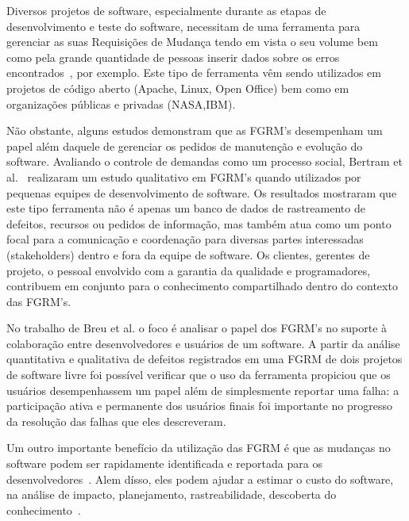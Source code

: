 Diversos projetos de software, especialmente durante as etapas de desenvolvimento e teste do
software, necessitam de uma ferramenta para gerenciar as suas Requisições de Mudança tendo em vista
o seu volume bem como pela grande quantidade de pessoas inserir dados sobre os erros
encontrados~\cite{1407819}, por exemplo. Este tipo de ferramenta vêm sendo utilizados em projetos de
código aberto (Apache, Linux, Open Office) bem como em organizações públicas e privadas
(NASA,IBM).

Não obstante, alguns estudos demonstram que as FGRM's desempenham um papel além daquele de gerenciar
os pedidos de manutenção e evolução do software. Avaliando o controle de demandas como um processo
social, Bertram et al.~\cite{Bertram:2010:CCB:1718918.1718972} realizaram um estudo qualitativo em
FGRM's quando utilizados por pequenas equipes de desenvolvimento de software. Os resultados
mostraram que este tipo ferramenta não é apenas um banco de dados de rastreamento de defeitos,
recursos ou pedidos de informação, mas também atua como um ponto focal para a comunicação e
coordenação para diversas partes interessadas (stakeholders) dentro e fora da equipe de software. Os
clientes, gerentes de projeto, o pessoal envolvido com a garantia da qualidade e programadores,
contribuem em conjunto para o conhecimento compartilhado dentro do contexto das FGRM's.
 
No trabalho de Breu et al.\cite{Breu:2010:INB:1718918.1718973} o foco é analisar o papel dos FGRM's
no suporte à colaboração entre desenvolvedores e usuários de um software. A partir da análise
quantitativa e qualitativa de defeitos registrados em uma FGRM de dois projetos de software livre
foi possível verificar que o uso da ferramenta propiciou que os usuários desempenhassem um papel
além de simplesmente reportar uma falha: a participação ativa e permanente dos usuários finais foi
importante no progresso da resolução das falhas que eles descreveram.


Um outro importante benefício da utilização das FGRM é que as mudanças no software podem ser
rapidamente identificada e reportada para os desenvolvedores~\cite{anvik2005coping}. Alem dísso, eles podem ajudar a estimar
o custo do software, na análise de impacto, planejamento, rastreabilidade, descoberta do
conhecimento~\cite{cavalcanti2013bug}.


